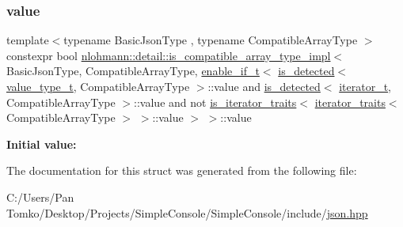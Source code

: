 \subsubsection{\texorpdfstring{value}{value}}
{\footnotesize\ttfamily template$<$typename Basic\+Json\+Type , typename Compatible\+Array\+Type $>$ \\
constexpr bool \mbox{\hyperlink{structnlohmann_1_1detail_1_1is__compatible__array__type__impl}{nlohmann\+::detail\+::is\+\_\+compatible\+\_\+array\+\_\+type\+\_\+impl}}$<$ Basic\+Json\+Type, Compatible\+Array\+Type, \mbox{\hyperlink{namespacenlohmann_1_1detail_a02bcbc878bee413f25b985ada771aa9c}{enable\+\_\+if\+\_\+t}}$<$ \mbox{\hyperlink{namespacenlohmann_1_1detail_a9135fcf616d6ac6e231a86e0a055ac44}{is\+\_\+detected}}$<$ \mbox{\hyperlink{namespacenlohmann_1_1detail_af91beae90c2fb0f931079b3d50a343bc}{value\+\_\+type\+\_\+t}}, Compatible\+Array\+Type $>$\+::value and \mbox{\hyperlink{namespacenlohmann_1_1detail_a9135fcf616d6ac6e231a86e0a055ac44}{is\+\_\+detected}}$<$ \mbox{\hyperlink{namespacenlohmann_1_1detail_a9ff93db146174305bce1bc4c54703e11}{iterator\+\_\+t}}, Compatible\+Array\+Type $>$\+::value and not \mbox{\hyperlink{structnlohmann_1_1detail_1_1is__iterator__traits}{is\+\_\+iterator\+\_\+traits}}$<$ \mbox{\hyperlink{structnlohmann_1_1detail_1_1iterator__traits}{iterator\+\_\+traits}}$<$ Compatible\+Array\+Type $>$ $>$\+::value $>$ $>$\+::value\hspace{0.3cm}{\ttfamily [static]}}

{\bfseries Initial value\+:}
\begin{DoxyCode}{0}
\DoxyCodeLine{=}

\end{DoxyCode}


The documentation for this struct was generated from the following file\+:\begin{DoxyCompactItemize}
\item 
C\+:/\+Users/\+Pan Tomko/\+Desktop/\+Projects/\+Simple\+Console/\+Simple\+Console/include/\mbox{\hyperlink{json_8hpp}{json.\+hpp}}\end{DoxyCompactItemize}
